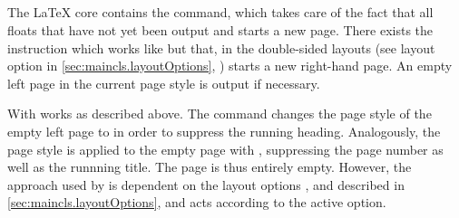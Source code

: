 \begin{Declaration}
  \\
  \\
  \\
  \\
\end{Declaration}%
%
%
%
%
%
The \LaTeX{} core contains the  command, which takes
care of the fact that all floats that have not yet been output and
starts a new page.  There exists the instruction
 which works like  but that,
in the double-sided layouts (see layout option  in
\autoref{sec:maincls.layoutOptions},
) starts a new right-hand page.
An empty left page in the current page style is output if necessary.

With  \KOMAScript{} works as described
above.  The  command changes the page
style of the empty left page to  in order to suppress
the running heading.  Analogously, the page style  is
applied to the empty page with ,
suppressing the page number as well as the runnning title. The page is
thus entirely empty. However, the approach used by
 is dependent on the layout options
,  and
 described in
\autoref{sec:maincls.layoutOptions},
 and acts according to the
active option.
%
%
%
%
%
%


